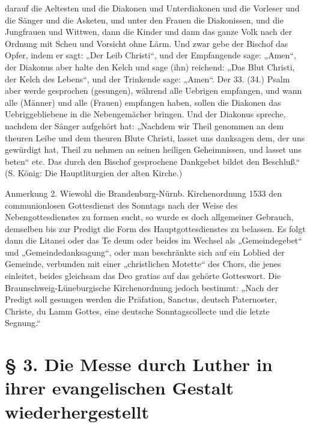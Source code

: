 darauf die Aeltesten und die Diakonen und Unterdiakonen und die Vorleser und die Sänger und die Asketen, und unter den Frauen die Diakonissen, und die Jungfrauen und Wittwen, dann die Kinder und dann das ganze Volk nach der Ordnung mit Scheu und Vorsicht ohne Lärm. Und zwar gebe der Bischof das Opfer, indem er sagt: „Der Leib Christi“, und der Empfangende sage: „Amen“, der Diakonus aber halte den Kelch und sage (ihn) reichend: „Das Blut Christi, der Kelch des Lebens“, und der Trinkende sage: „Amen“. Der 33. (34.) Psalm aber werde gesprochen (gesungen), während alle Uebrigen empfangen, und wann alle (Männer) und alle (Frauen) empfangen haben, sollen die Diakonen das Uebriggebliebene in die Nebengemächer bringen. Und der Diakonus spreche, nachdem der Sänger aufgehört hat: „Nachdem wir Theil genommen an dem theuren Leibe und dem theuren Blute Christi, lasset uns danksagen dem, der uns gewürdigt hat, Theil zu nehmen an seinen heiligen Geheimnissen, und lasset uns beten“ etc. Das durch den Bischof gesprochene Dankgebet bildet den Beschluß.“ (S. König: Die Hauptliturgien der alten Kirche.)

Anmerkung 2. Wiewohl die Brandenburg-Nürnb. Kirchenordnung 1533 den communionlosen Gottesdienst des Sonntags nach der Weise des Nebengottesdienstes zu formen sucht, so wurde es doch allgemeiner Gebrauch, demselben bis zur Predigt die Form des Hauptgottesdienstes zu belassen. Es folgt dann die Litanei oder das Te deum oder beides im Wechsel als „Gemeindegebet“ und „Gemeindedanksagung“, oder man beschränkte sich auf ein Loblied der Gemeinde, verbunden mit einer „christlichen Motette“ des Chors, die jenes einleitet, beides gleichsam das Deo gratias auf das gehörte Gotteswort. Die Braunschweig-Lüneburgische Kirchenordnung jedoch bestimmt: „Nach der Predigt soll gesungen werden die Präfation, Sanctus, deutsch Paternoster, Christe, du Lamm Gottes, eine deutsche Sonntagscollecte und die letzte Segnung.“

\chapter[§ 3. Die Messe durch Luther]{§ 3. Die Messe durch Luther in ihrer evangelischen Gestalt wiederhergestellt}


